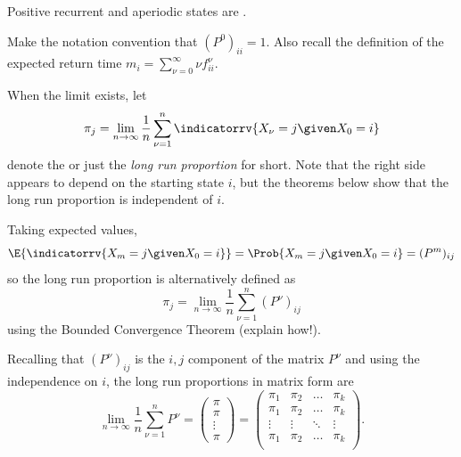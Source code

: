 \documentclass[12pt]{article}
\begin{document}
\begin{definition}
    Positive recurrent and aperiodic states are .
\end{definition}

\begin{remark}
    Make the notation convention that \( (P^{0})_{ii} = 1 \).  Also
    recall the definition of the expected return time \( m_i = \sum_ {\nu=0}^
    {\infty} \nu f^\nu_{ii} \).
\end{remark}

\begin{definition}
    When the limit exists, let
    \[
        \pi_j = \lim_{n \to \infty} \frac{1}{n} \sum\limits_{\nu=1}^n
        \indicatorrv{X_{\nu}= j \given X_0 = i}
    \] denote the  or just the \emph{long run proportion} for short.
    Note that the right side appears to depend on the starting state \(
    i \), but the theorems below show that the long run proportion is
    independent of \( i \).
\end{definition}

\begin{remark}
    Taking expected values,
    \[
        \E{\indicatorrv{X_m = j \given X_0 = i}} = \Prob{X_m = j \given
        X_0 = i} = (P^m)_{ij}
    \] so the long run proportion is alternatively defined as
    \[
        \pi_j = \lim_{n \to \infty} \frac{1}{n} \sum\limits_{\nu=1}^n (P^
        {\nu})_ {ij}
    \] using the Bounded Convergence Theorem (explain how!).
\end{remark}

\begin{remark}
    Recalling that \( (P^{\nu})_{ij} \) is the \( i,j \) component of
    the matrix \( P^{\nu} \) and using the independence on \( i \), the
    long run proportions in matrix form are
    \[
        \lim_{n \to \infty} \frac{1}{n} \sum\limits_{\nu=1}^n P^{\nu} =
        \begin{pmatrix}
            \pi \\
            \pi \\
            \vdots \\
            \pi
        \end{pmatrix}
        =
        \begin{pmatrix}
            \pi_1 & \pi_2 & \ldots & \pi_k \\
            \pi_1 & \pi_2 & \ldots & \pi_k \\
            \vdots & \vdots & \ddots & \vdots \\
            \pi_1 & \pi_2 & \ldots & \pi_k \\
        \end{pmatrix}
        .
    \]
\end{remark}
\end{document}
